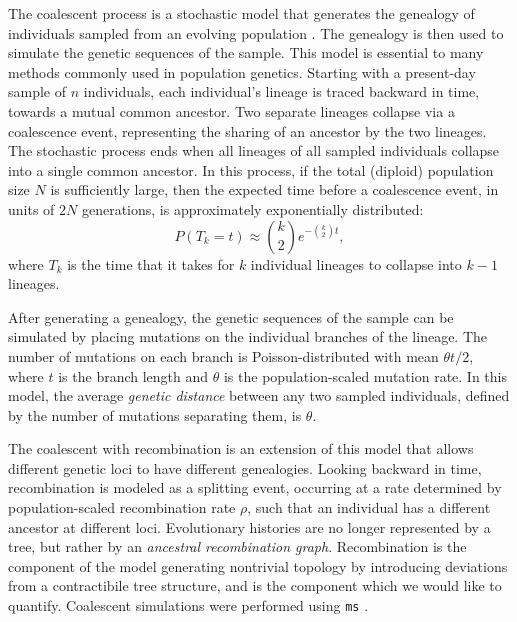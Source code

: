 The coalescent process is a stochastic model that generates the genealogy of individuals sampled from an evolving population \cite{Wakeley:2009}.
The genealogy is then used to simulate the genetic sequences of the sample.
This model is essential to many methods commonly used in population genetics.
Starting with a present-day sample of $n$ individuals, each individual's lineage is traced backward in time, towards a mutual common ancestor.
Two separate lineages collapse via a coalescence event, representing the sharing of an ancestor by the two lineages.
The stochastic process ends when all lineages of all sampled individuals collapse into a single common ancestor.
In this process, if the total (diploid) population size $N$ is sufficiently large, then the expected time before a coalescence event, in units of $2N$ generations, is approximately exponentially distributed:
\begin{equation}
P(T_{k}=t) \approx \binom{k}{2} e ^{-\binom{k}{2} t},
\end{equation}
where $T_k$ is the time that it takes for $k$ individual lineages to collapse into $k-1$ lineages.

After generating a genealogy, the genetic sequences of the sample can be simulated by placing mutations on the individual branches of the lineage.
The number of mutations on each branch is Poisson-distributed with mean $\theta t / 2$, where $t$ is the branch length and $\theta$ is the population-scaled mutation rate.
In this model, the average \emph{genetic distance} between any two sampled individuals, defined by the number of mutations separating them, is $\theta$.

The coalescent with recombination is an extension of this model that allows different genetic loci to have different genealogies.
Looking backward in time, recombination is modeled as a splitting event, occurring at a rate determined by population-scaled recombination rate $\rho$, such that an individual has a different ancestor at different loci.
Evolutionary histories are no longer represented by a tree, but rather by an \emph{ancestral recombination graph}.
Recombination is the component of the model generating nontrivial topology by introducing deviations from a contractibile tree structure, and is the component which we would like to quantify.
Coalescent simulations were performed using \texttt{ms} \cite{Hudson:2002}.


